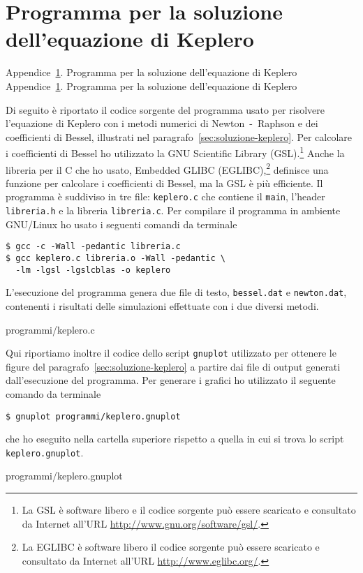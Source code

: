\cleardoublepage{}
\chapter{Programma per la soluzione dell'equazione di Keplero}
\label{cha:soluzione-keplero}
\markboth%
{Appendice~\ref{cha:soluzione-keplero}. Programma per la soluzione
  dell'equazione di Keplero}%
{Appendice~\ref{cha:soluzione-keplero}. Programma per la soluzione
  dell'equazione di Keplero}

Di seguito è riportato il codice sorgente del programma usato per risolvere
l'equazione di Keplero con i metodi numerici di Newton~-~Raphson e dei
coefficienti di Bessel, illustrati nel
paragrafo~\ref{sec:soluzione-keplero}. Per calcolare i coefficienti di Bessel ho
utilizzato la GNU Scientific Library (GSL).\footnote{La GSL è software libero e
  il codice sorgente può essere scaricato e consultato da Internet all'URL
  \url{http://www.gnu.org/software/gsl/}.} Anche la libreria per il C che ho
usato, Embedded GLIBC (EGLIBC),\footnote{La EGLIBC è software libero il codice
  sorgente può essere scaricato e consultato da Internet all'URL
  \url{http://www.eglibc.org/}.} definisce una funzione per calcolare i
coefficienti di Bessel, ma la GSL è più efficiente. Il programma è suddiviso in
tre file: \verb|keplero.c| che contiene il \verb|main|, l'header
\verb|libreria.h| e la libreria \verb|libreria.c|. Per compilare il programma in
ambiente GNU/Linux ho usato i seguenti comandi da terminale
\begin{verbatim}
$ gcc -c -Wall -pedantic libreria.c
$ gcc keplero.c libreria.o -Wall -pedantic \
  -lm -lgsl -lgslcblas -o keplero
\end{verbatim}
L'esecuzione del programma genera due file di testo, \verb|bessel.dat| e
\verb|newton.dat|, contenenti i risultati delle simulazioni effettuate con i due
diversi metodi.

{programmi/keplero.c}



Qui riportiamo inoltre il codice dello script \verb|gnuplot| utilizzato per
ottenere le figure del paragrafo~\ref{sec:soluzione-keplero} a partire dai file
di output generati dall'esecuzione del programma. Per generare i grafici ho
utilizzato il seguente comando da terminale
\begin{verbatim}
$ gnuplot programmi/keplero.gnuplot
\end{verbatim}
che ho eseguito nella cartella superiore rispetto a quella in cui si trova lo
script \verb|keplero.gnuplot|.

{programmi/keplero.gnuplot}

